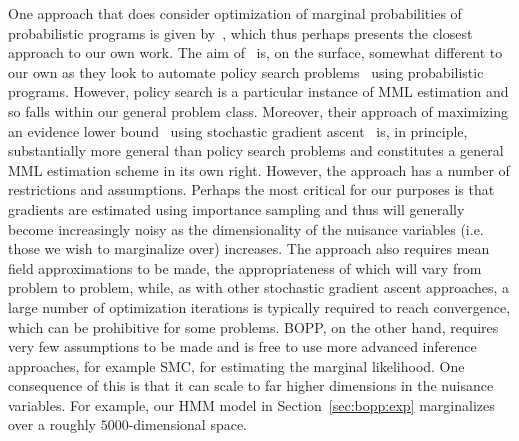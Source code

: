One approach that does consider optimization of marginal probabilities of probabilistic
programs is given by~\cite{vandemeent2016black}, which thus perhaps presents the closest
approach to our own work.  The aim of~\cite{vandemeent2016black} is, on the surface, somewhat
different to our own as they look to automate policy search problems~\citep{deisenroth2013survey}
using probabilistic programs.  However, policy search is a particular instance of MML estimation
and so falls within our general problem class.  Moreover, their approach of maximizing an evidence lower bound~\citep{blei2016variational}
using stochastic gradient ascent~\citep{robbins1951stochastic} is, in principle, substantially
more general than policy search problems and constitutes a general MML estimation scheme in its own right.
However, the approach has a number of restrictions and assumptions.  
Perhaps the most critical for our purposes is that gradients are estimated using
importance sampling and thus will generally become increasingly noisy as the dimensionality of the nuisance variables (i.e. those we wish to marginalize over) increases.
The approach also requires mean field approximations
to be made, the appropriateness of which will vary from problem to problem, while, as with other
stochastic gradient ascent approaches, a large number of optimization iterations is typically required
to reach convergence, which can be prohibitive for some problems.  BOPP, on the other hand, requires
very few assumptions to be made and is free to use more advanced inference approaches, for example
SMC, for estimating the marginal likelihood.  One consequence of this is that it can scale to far
higher dimensions in the nuisance variables.  For example, our HMM model in Section~\ref{sec:bopp:exp}
marginalizes over a roughly $5000$-dimensional space.


